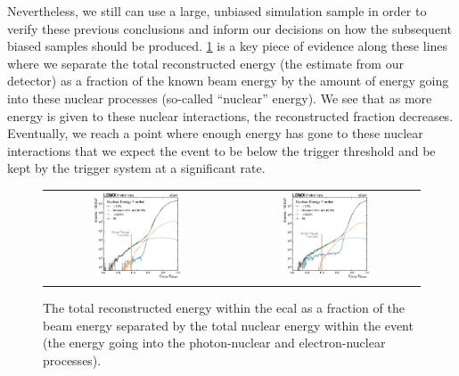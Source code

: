 Nevertheless, we still can use a large, unbiased simulation sample in order to verify
these previous conclusions and inform our decisions on how the subsequent biased samples
should be produced.
\cref{fig:rec-efrac-by-nuc} is a key piece of evidence along these lines
where we separate the total reconstructed energy (the estimate from our detector)
as a fraction of the known beam energy by the amount of energy going into these nuclear
processes (so-called ``nuclear'' energy).
We see that as more energy is given to these nuclear interactions,
the reconstructed fraction decreases.
Eventually, we reach a point where enough energy has gone to these nuclear interactions
that we expect the event to be below the trigger threshold and be kept by the trigger
system at a significant rate.

\begin{figure}
  \centering
  \begin{tabular}{cc}
    \includegraphics[width=0.49\textwidth]{figures/ldmx/simulation/4gev-ecal-by-nuc.pdf}
    &
    \includegraphics[width=0.49\textwidth]{figures/ldmx/simulation/8gev-ecal-by-nuc.pdf}
  \end{tabular}
  \caption{The total reconstructed energy within the \ac{ecal} as a fraction of the beam energy
  separated by the total nuclear energy within the event (the energy going into the photon-nuclear
  and electron-nuclear processes).}
  \label{fig:rec-efrac-by-nuc}
\end{figure}

